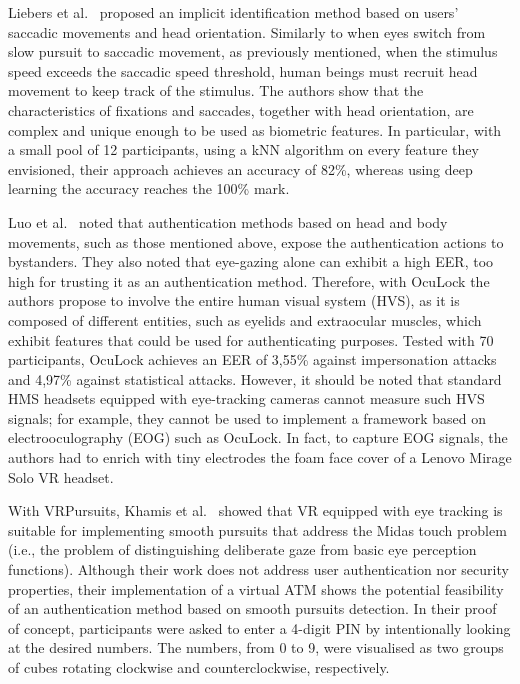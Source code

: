 \documentclass[journal]{IEEEtran}
\begin{document}
Liebers et al.~\cite{liebers2021gaze} proposed an implicit identification method based on users' saccadic movements and head orientation. Similarly to when eyes switch from slow pursuit to saccadic movement, as previously mentioned, when the stimulus speed exceeds the saccadic speed threshold, human beings must recruit head movement to keep track of the stimulus. The authors show that the characteristics of fixations and saccades, together with head orientation, are complex and unique enough to be used as biometric features. In particular, with a small pool of 12 participants, using a kNN algorithm on every feature they envisioned, their approach achieves an accuracy of 82\%, whereas using deep learning the accuracy reaches the 100\% mark.

Luo et al.~\cite{luo2020} noted that authentication methods based on head and body movements, such as those mentioned above, expose the authentication actions to bystanders. They also noted that eye-gazing alone can exhibit a high EER, too high for trusting it as an authentication method. Therefore, with OcuLock the authors propose to involve the entire human visual system (HVS), as it is composed of different entities, such as eyelids and extraocular muscles, which exhibit features that could be used for authenticating purposes. Tested with 70 participants, OcuLock achieves an EER of 3,55\%  against impersonation attacks and 4,97\% against statistical attacks. However, it should be noted that standard HMS headsets equipped with eye-tracking cameras cannot measure such HVS signals; for example, they cannot be used to implement a framework based on electrooculography (EOG) such as OcuLock. In fact, to capture EOG signals, the authors had to enrich with tiny electrodes the foam face cover of a Lenovo Mirage Solo VR headset.

With VRPursuits, Khamis et al.~\cite{khamis2018} showed that VR equipped with eye tracking is suitable for implementing smooth pursuits that address the Midas touch problem (i.e., the problem of distinguishing deliberate gaze from basic eye perception functions). Although their work does not address user authentication nor security properties, their implementation of a virtual ATM shows the potential feasibility of an authentication method based on smooth pursuits detection. In their proof of concept, participants were asked to enter a 4-digit PIN by intentionally looking at the desired numbers. The numbers, from 0 to 9, were visualised as two groups of cubes rotating clockwise and counterclockwise, respectively. 
\end{document}

